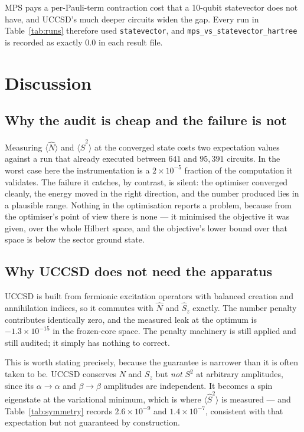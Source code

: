 \documentclass[11pt,a4paper]{article}
\newcommand{\Ssq}{\ensuremath{\langle \hat{S}^2 \rangle}}
\newcommand{\Nop}{\ensuremath{\langle \hat{N} \rangle}}
\newcommand{\code}[1]{\texttt{\small #1}}
\begin{document}
MPS pays a per-Pauli-term contraction cost that a 10-qubit statevector does not
have, and UCCSD's much deeper circuits widen the gap. Every run in
Table~\ref{tab:runs} therefore used \code{statevector}, and
\code{mps\_vs\_statevector\_hartree} is recorded as exactly $0.0$ in each result
file.

\section{Discussion}

\subsection{Why the audit is cheap and the failure is not}

Measuring $\Nop$ and $\Ssq$ at the converged state costs two expectation values
against a run that already executed between $641$ and $95{,}391$ circuits. In
the worst case here the instrumentation is a $2\times10^{-5}$ fraction of the
computation it validates. The failure it catches, by contrast, is silent: the
optimiser converged cleanly, the energy moved in the right direction, and the
number produced lies in a plausible range. Nothing in the optimisation reports a
problem, because from the optimiser's point of view there is none --- it
minimised the objective it was given, over the whole Hilbert space, and the
objective's lower bound over that space is below the sector ground state.

\subsection{Why UCCSD does not need the apparatus}

UCCSD is built from fermionic excitation operators with balanced creation and
annihilation indices, so it commutes with $\hat N$ and $\hat S_z$ exactly. The
number penalty contributes identically zero, and the measured leak at the
optimum is $-1.3\times10^{-15}$ in the frozen-core space. The penalty machinery
is still applied and still audited; it simply has nothing to correct.

This is worth stating precisely, because the guarantee is narrower than it is
often taken to be. UCCSD conserves $N$ and $S_z$ but \emph{not} $S^2$ at
arbitrary amplitudes, since its $\alpha \to \alpha$ and $\beta \to \beta$
amplitudes are independent. It becomes a spin eigenstate at the variational
minimum, which is where $\Ssq$ is measured --- and Table~\ref{tab:symmetry}
records $2.6\times10^{-9}$ and $1.4\times10^{-7}$, consistent with that
expectation but not guaranteed by construction.
\end{document}
